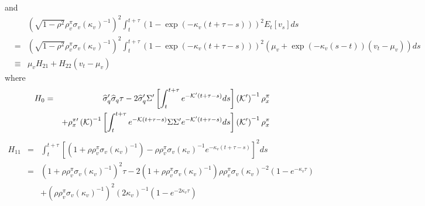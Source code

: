 \documentclass{article}
\begin{document}
and%
\begin{eqnarray*}
&&\left( \sqrt{1-\rho ^{2}}\rho _{v}^{\pi }\sigma _{v}\left( \kappa
_{v}\right) ^{-1}\right) ^{2}\int_{t}^{t+\tau }\left( 1-\exp \left( -\kappa
_{v}\left( t+\tau -s\right) \right) \right) ^{2}E_{t}\left[ v_{s}\right] ds
\\
&=&\left( \sqrt{1-\rho ^{2}}\rho _{v}^{\pi }\sigma _{v}\left( \kappa
_{v}\right) ^{-1}\right) ^{2}\int_{t}^{t+\tau }\left( 1-\exp \left( -\kappa
_{v}\left( t+\tau -s\right) \right) \right) ^{2}\left( \mu _{v}+\exp \left(
-\kappa _{v}\left( s-t\right) \right) \left( v_{t}-\mu _{v}\right) \right) ds
\\
&\equiv &\mu _{v}H_{21}+H_{22}\left( v_{t}-\mu _{v}\right) 
\end{eqnarray*}%
where%
\begin{eqnarray*}
H_{0} &=&\widehat{\sigma }_{q}^{\prime }\widehat{\sigma }_{q}\tau -2\widehat{%
\sigma }_{q}^{\prime }\Sigma ^{\prime }\left[ \int_{t}^{t+\tau }e^{-\mathcal{%
K}^{\prime }\left( t+\tau -s\right) }ds\right] \left( \mathcal{K}^{\prime
}\right) ^{-1}\rho _{x}^{\pi } \\
&&+\rho _{x}^{\pi \prime }\left( \mathcal{K}\right) ^{-1}\left[
\int_{t}^{t+\tau }e^{-\mathcal{K}\left( t+\tau -s\right) }\Sigma \Sigma
^{\prime }e^{-\mathcal{K}^{\prime }\left( t+\tau -s\right) }ds\right] \left( 
\mathcal{K}^{\prime }\right) ^{-1}\rho _{x}^{\pi }
\end{eqnarray*}%
\begin{eqnarray*}
H_{11} &=&\int_{t}^{t+\tau }\left[ \left( 1+\rho \rho _{v}^{\pi }\sigma
_{v}\left( \kappa _{v}\right) ^{-1}\right) -\rho \rho _{v}^{\pi }\sigma
_{v}\left( \kappa _{v}\right) ^{-1}e^{-\kappa _{v}\left( t+\tau -s\right) }%
\right] ^{2}ds \\
&=&\left( 1+\rho \rho _{v}^{\pi }\sigma _{v}\left( \kappa _{v}\right)
^{-1}\right) ^{2}\tau -2\left( 1+\rho \rho _{v}^{\pi }\sigma _{v}\left(
\kappa _{v}\right) ^{-1}\right) \rho \rho _{v}^{\pi }\sigma _{v}\left(
\kappa _{v}\right) ^{-2}\left( 1-e^{-\kappa _{v}\tau }\right)  \\
&&+\left( \rho \rho _{v}^{\pi }\sigma _{v}\left( \kappa _{v}\right)
^{-1}\right) ^{2}\left( 2\kappa _{v}\right) ^{-1}\left( 1-e^{-2\kappa
_{v}\tau }\right) 
\end{eqnarray*}%
\end{document}
